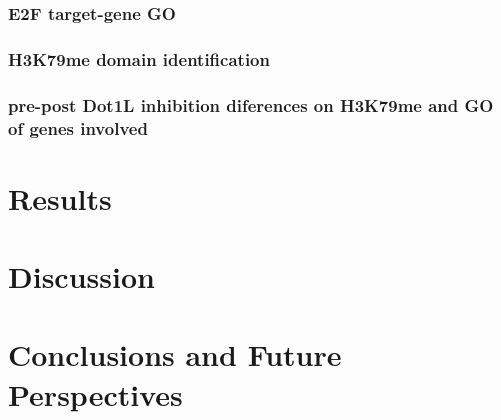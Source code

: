 \documentclass[11pt,twoside,a4paper]{report}
\begin{document}
		\subsection{E2F target-gene GO}
		\subsection{H3K79me domain identification}
		\subsection{pre-post Dot1L inhibition diferences on H3K79me and GO of genes involved}


\clearpage

\chapter{Results}



\clearpage

\chapter{Discussion}


\clearpage

\chapter{Conclusions and Future Perspectives}



\cleardoublepage
%
%


\end{document}
